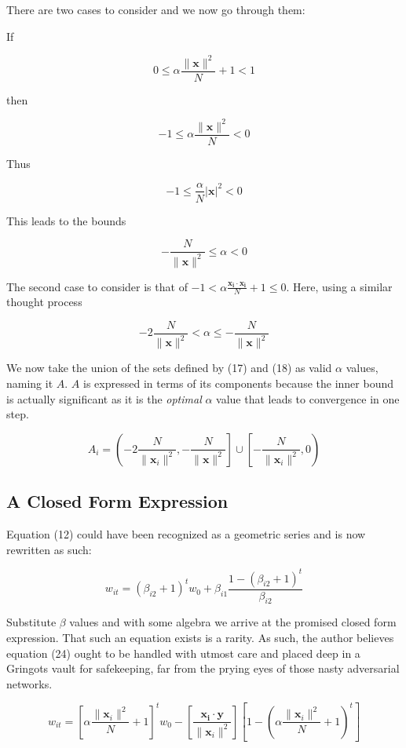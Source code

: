 \documentclass[]{article}
\begin{document}
There are two cases to consider and we now go through them:

If

\[
0 \le \alpha\frac{\|\mathbf{x}\|^2}{N} + 1 < 1
\]

then

\[
-1 \le \alpha\frac{\|\mathbf{x}\|^2}{N} < 0
\]

Thus

\[
-1 \le  \frac{\alpha}{N}|\mathbf{x}|^2 < 0
\]

This leads to the bounds

\[
-\frac{N}{\|\mathbf{x}\|^2} \le \alpha< 0
\]

The second case to consider is that of
\(-1 < \alpha\frac{\mathbf{x_i}\cdot\mathbf{x_i}}{N} + 1 \le 0\). Here,
using a similar thought process

\[
-2\frac{N}{\|\mathbf{x}\|^2} < \alpha \le -\frac{N}{\|\mathbf{x}\|^2}
\]

We now take the union of the sets defined by (17) and (18) as valid
\(\alpha\) values, naming it \(A\). \(A\) is expressed in terms of its
components because the inner bound is actually significant as it is the
\emph{optimal} \(\alpha\) value that leads to convergence in one step.

\[
A_i = \left( -2\frac{N}{\|\mathbf{x}_i\|^2},  -\frac{N}{\|\mathbf{x}\|^2}\right] \cup \left[-\frac{N}{\|\mathbf{x}_i\|^2}, 0 \right)
\]

\subsection{A Closed Form Expression}\label{a-closed-form-expression}

Equation (12) could have been recognized as a geometric series and is
now rewritten as such:

\[
w_{it} = (\beta_{i2}+1)^t w_0+ \beta_{i1}\frac{1-(\beta_{i2}+1)^{t}}{\beta_{i2}}
\]

Substitute \(\beta\) values and with some algebra we arrive at the
promised closed form expression. That such an equation exists is a
rarity. As such, the author believes equation (24) ought to be handled
with utmost care and placed deep in a Gringots vault for safekeeping,
far from the prying eyes of those nasty adversarial networks.

\[
w_{it} = \left[\alpha\frac{\|\mathbf{x}_i\|^2}{N} + 1\right]^t w_0-\left[\frac{\mathbf{x_i}\cdot\mathbf{y}}{\|\mathbf{x}_i\|^2} \right]\left[1-\left(\alpha\frac{\|\mathbf{x}_i\|^2}{N} + 1\right)^t\right]
\]
\end{document}
